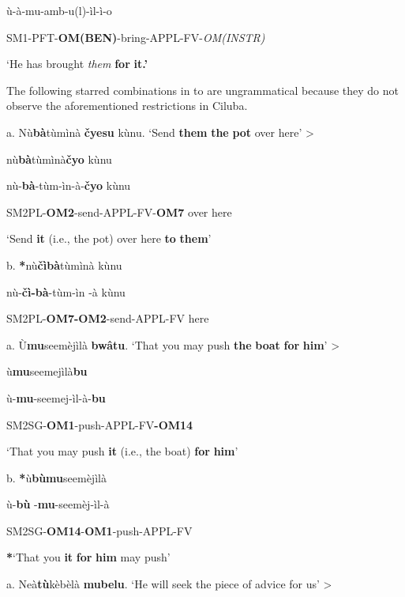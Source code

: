\documentclass[output=paper]{langscibook}
\begin{document}
ù-à-{mu-a}mb-u(l)-{ì}l-{ì-}o

SM1-PFT-{\textbf{OM(BEN)}{}-bring}{}-{APPL}{}-{FV-}\textit{OM(INSTR)}

\glt ‘He has brought \textit{them} \textbf{for} \textbf{it.’}

The following starred combinations in  to  are ungrammatical because they do not observe the aforementioned restrictions in Ciluba.

\ea%
    \label{ex:lukusa:36}
    \z

          a.   Nù\textbf{bà}tùmìnà \textbf{čyesu} kùnu.        ‘Send \textbf{them} \textbf{the} \textbf{pot} over here’   >

nù\textbf{bà}tùmìnà\textbf{čyo}  kùnu

nù-\textbf{bà}{}-tùm-ìn-à-\textbf{čyo}              kùnu

SM2PL-\textbf{OM2}{}-send-APPL-FV-\textbf{OM7}     over here

\glt ‘Send \textbf{it} (i.e., the pot) over here \textbf{to} \textbf{them}’

b.  \textbf{*}nù\textbf{čìbà}tùmìnà  kùnu

nù-\textbf{čì-bà}{}-tùm-ìn  {}-à              kùnu

  SM2PL-\textbf{OM7-OM2}{}-send-APPL-FV     here

\ea%
    \label{ex:lukusa:37}
    \z

           a.  Ù\textbf{mu}seemèjìlà \textbf{bwâtu}.  ‘That you may push \textbf{the} \textbf{boat} \textbf{for} \textbf{him}’ >

  ù\textbf{mu}seemejìlà\textbf{bu}

  ù-\textbf{mu}{}-seemej-ìl-à-\textbf{bu}

SM2SG-\textbf{OM1}{}-push-APPL-FV\textbf{{}-OM14}

\glt ‘That you may push \textbf{it} (i.e., the boat) \textbf{for} \textbf{him}’

b.  \textbf{*}ù\textbf{bùmu}seemèjìlà

  ù-\textbf{bù}  {}-\textbf{mu}{}-seemèj-ìl-à

SM2SG-\textbf{OM14}{}-\textbf{OM1}{}-push-APPL-FV

       \textbf{*}‘That you \textbf{it}  \textbf{for} \textbf{him} may push’

\ea%
    \label{ex:lukusa:38}
    \z

           a.  Neà\textbf{tù}kèbèlà \textbf{mubelu}.  ‘He will seek the piece of advice for us’  >
\end{document}
